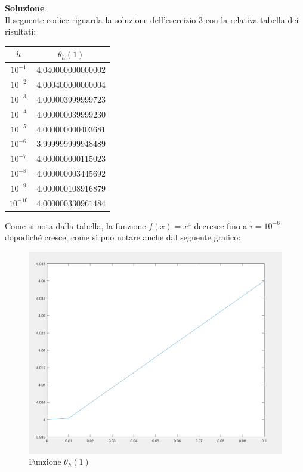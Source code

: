 \large\noindent{}
\begin{flushleft}
	\large \textbf{Soluzione}\\[0.5cm]
	Il seguente codice riguarda la soluzione dell'esercizio 3 con la relativa tabella dei risultati:
	
	\begin{center}
		\begin{tabular}{|c|c|}
			\hline
				$h$ & $\theta_{h}(1)$ \\
			\hline
    			\(10^{-1}\) & $4.040000000000002$\\
    			\(10^{-2}\) & $4.000400000000004$\\
    			\(10^{-3}\) & $4.000003999999723$\\
    			\(10^{-4}\) & $4.000000039999230$\\
    			\(10^{-5}\) & $4.000000000403681$\\
    			\(10^{-6}\) & $3.999999999948489$\\
    			\(10^{-7}\) & $4.000000000115023$\\
    			\(10^{-8}\) & $4.000000003445692$\\
    			\(10^{-9}\) & $4.000000108916879$\\
    			\(10^{-10}\) & $4.000000330961484$\\
			\hline
		\end{tabular}
	\end{center}
	Come si nota dalla tabella, la funzione $f(x) = x^{4}$ decresce fino a $ i = 10^{-6}$ dopodiché cresce, come si puo notare anche dal seguente grafico:
	\begin{figure}[H]
	\label{Cap_1_Es_3}
	\includegraphics[width=\textwidth]{Codici/Cap1/Es3_Fig}
		\caption{Funzione $\theta_{h}(1)$}
	\end{figure}
\end{flushleft}